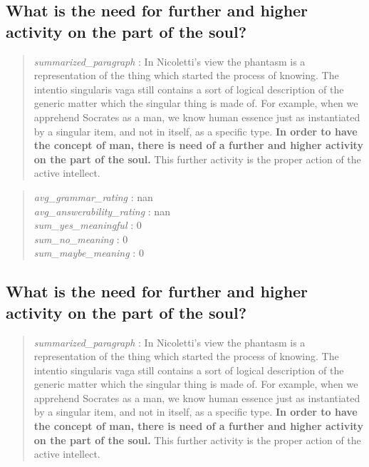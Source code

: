 \hypertarget{what-is-the-need-for-further-and-higher-activity-on-the-part-of-the-soul}{%
\subsection{What is the need for further and higher activity on the part
of the
soul?}\label{what-is-the-need-for-further-and-higher-activity-on-the-part-of-the-soul}}

\begin{quote}
\emph{summarized\_paragraph} : In Nicoletti's view the phantasm is a
representation of the thing which started the process of knowing. The
intentio singularis vaga still contains a sort of logical description of
the generic matter which the singular thing is made of. For example,
when we apprehend Socrates as a man, we know human essence just as
instantiated by a singular item, and not in itself, as a specific type.
\textbf{In order to have the concept of man, there is need of a further
and higher activity on the part of the soul.} This further activity is
the proper action of the active intellect.
\end{quote}

\begin{quote}
\emph{avg\_grammar\_rating} : nan\\
\emph{avg\_answerability\_rating} : nan\\
\emph{sum\_yes\_meaningful} : 0\\
\emph{sum\_no\_meaning} : 0\\
\emph{sum\_maybe\_meaning} : 0
\end{quote}

\hypertarget{what-is-the-need-for-further-and-higher-activity-on-the-part-of-the-soul-1}{%
\subsection{What is the need for further and higher activity on the part
of the
soul?}\label{what-is-the-need-for-further-and-higher-activity-on-the-part-of-the-soul-1}}

\begin{quote}
\emph{summarized\_paragraph} : In Nicoletti's view the phantasm is a
representation of the thing which started the process of knowing. The
intentio singularis vaga still contains a sort of logical description of
the generic matter which the singular thing is made of. For example,
when we apprehend Socrates as a man, we know human essence just as
instantiated by a singular item, and not in itself, as a specific type.
\textbf{In order to have the concept of man, there is need of a further
and higher activity on the part of the soul.} This further activity is
the proper action of the active intellect.
\end{quote}

